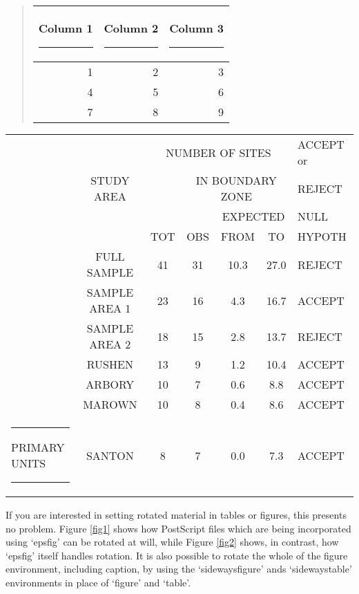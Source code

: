 \documentclass[twoside]{article}
\begin{document}
\begin{example}
\begin{quote}
\rule{0pt}{1.5in}\begin{tabular}{rrr}
\begin{rotate}{45}Column 1\end{rotate}
\rule{.5cm}{0pt}&
\begin{rotate}{45}Column 2\end{rotate}
\rule{.5cm}{0pt}&
\begin{rotate}{45}Column 3\end{rotate}
\rule{.5cm}{0pt}\\
\hline
1& 2& 3\\
4& 5& 6\\
7& 8& 9\\
\hline
\end{tabular}
\end{quote}
\end{example}

\begin{example}
\begin{sideways}
\begin{tabular}{|l|c|c|c|c|c|p{1in}|}
\hline
&&\multicolumn{4}{c}{NUMBER OF SITES}\vline &ACCEPT or\\
\cline{3-6} &STUDY AREA&&\multicolumn{3}{c}{%
IN BOUNDARY ZONE}\vline&REJECT\\
\cline{4-6}&&&&\multicolumn{2}{c}{EXPECTED}
\vline&NULL\\
\cline{5-6}&&TOT&OBS&FROM&TO&HYPOTH\\
\cline{2-7}
&FULL SAMPLE&41&31&10.3&27.0&REJECT\\
&SAMPLE AREA 1&23&16&4.3&16.7&ACCEPT\\
&SAMPLE AREA 2&18&15&2.8&13.7&REJECT\\
&RUSHEN&13&9&1.2&10.4&ACCEPT\\
&ARBORY&10&7&0.6&8.8&ACCEPT\\
&MAROWN&10&8&0.4&8.6&ACCEPT\\
\rule{0.5cm}{0pt}
\begin{rotate}{90}PRIMARY UNITS%
\end{rotate}\rule{0.5cm}{0pt}
&SANTON&8&7&0.0&7.3&ACCEPT\\
\hline
\end{tabular}
\end{sideways}
\end{example}

If you are interested in setting rotated material in tables or
figures, this presents no problem. Figure \ref{fig1} shows how
PostScript files which are being incorporated using `epsfig' can be
rotated at will, while Figure \ref{fig2} shows, in contrast, how
`epsfig' itself handles rotation. It is also possible to rotate the
whole of the figure environment, including caption, 
by using the `sidewaysfigure' ands `sidewaystable' environments
in place of `figure' and `table'. 
\end{document}
